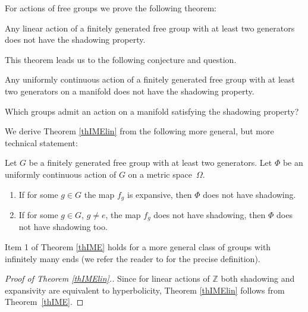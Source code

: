 For actions of free groups we prove the following theorem:

\begin{thm}
\label{thIMElin}
Any linear action of a
finitely generated free group with at least two generators
does not have the shadowing property.
\end{thm}

This theorem leads us to the following conjecture and question.

\begin{conj}
Any uniformly continuous action of a finitely generated free group with at least two generators on a manifold does not have the shadowing property.
\end{conj}
\begin{question}
Which groups admit an action on a manifold satisfying the shadowing property?
\end{question}

We derive Theorem \ref{thIMElin} from the following more general, but more technical statement:

\begin{thm}
\label{thIME}
Let $G$ be a finitely generated free group with at least two generators. Let $\Phi$ be an uniformly continuous action of $G$ on a metric space~$\Omega$.
\begin{enumerate}
	\item If for some $g\in G$ the map $f_{g}$ is expansive, then $\Phi$ does not have shadowing.
  \item If for some $g\in G$, $g \ne e$, the map $f_{g}$ does not have shadowing, then $\Phi$ does not have shadowing too.
\end{enumerate}
\end{thm}

\begin{remark}
\label{remIME}
Item 1 of Theorem \ref{thIME} holds for a more general class of groups with infinitely many ends (we refer the reader to \cite{BrHaef} for the precise definition).
\end{remark}

\begin{proof}[Proof of Theorem \ref{thIMElin}.]
Since for linear actions of $\mathbb{Z}$ both shadowing and expansivity are equivalent to hyperbolicity, Theorem \ref{thIMElin} follows from Theorem~\ref{thIME}.
\end{proof}


